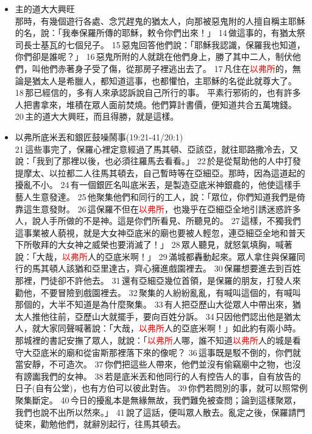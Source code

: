\begin{itemize}
\begin{itemize}
\item 主的道大大興旺\\
那時，有幾個遊行各處、念咒趕鬼的猶太人，向那被惡鬼附的人擅自稱主耶穌的名，說：「我奉保羅所傳的耶穌，敕令你們出來！」 14 做這事的，有猶太祭司長士基瓦的七個兒子。 15 惡鬼回答他們說：「耶穌我認識，保羅我也知道，你們卻是誰呢？」 16 惡鬼所附的人就跳在他們身上，勝了其中二人，制伏他們，叫他們赤著身子受了傷，從那房子裡逃出去了。 17 凡住在\textcolor{red}{以弗所}的，無論是猶太人是希臘人，都知道這事，也都懼怕，主耶穌的名從此就尊大了。 18 那已經信的，多有人來承認訴說自己所行的事。
平素行邪術的，也有許多人把書拿來，堆積在眾人面前焚燒。他們算計書價，便知道共合五萬塊錢。 20 主的道大大興旺，而且得勝，就是這樣。
\item 以弗所底米丟和銀匠鼓噪鬧事(19:21-41/20:1)\\
21 這些事完了，保羅心裡定意經過了馬其頓、亞該亞，就往耶路撒冷去，又說：「我到了那裡以後，也必須往羅馬去看看。」 22 於是從幫助他的人中打發提摩太、以拉都二人往馬其頓去，自己暫時等在亞細亞。那時，因為這道起的擾亂不小。 24 有一個銀匠名叫底米丟，是製造亞底米神銀龕的，他使這樣手藝人生意發達。 25 他聚集他們和同行的工人，說：「眾位，你們知道我們是倚靠這生意發財。 26 這保羅不但在\textcolor{red}{以弗所}，也幾乎在亞細亞全地引誘迷惑許多人，說人手所做的不是神。這是你們所看見、所聽見的。 27 這樣，不獨我們這事業被人藐視，就是大女神亞底米的廟也要被人輕忽，連亞細亞全地和普天下所敬拜的大女神之威榮也要消滅了！」 28 眾人聽見，就怒氣填胸，喊著說：「大哉，\textcolor{red}{以弗所}人的亞底米啊！」 29 滿城都轟動起來。眾人拿住與保羅同行的馬其頓人該猶和亞里達古，齊心擁進戲園裡去。 30 保羅想要進去到百姓那裡，門徒卻不許他去。 31 還有亞細亞幾位首領，是保羅的朋友，打發人來勸他，不要冒險到戲園裡去。 32 聚集的人紛紛亂亂，有喊叫這個的，有喊叫那個的，大半不知道是為什麼聚集。 33 有人把亞歷山大從眾人中帶出來，猶太人推他往前，亞歷山大就擺手，要向百姓分訴。 34 只因他們認出他是猶太人，就大家同聲喊著說：「大哉，\textcolor{red}{以弗所}人的亞底米啊！」如此約有兩小時。那城裡的書記安撫了眾人，就說：「\textcolor{red}{以弗所}人哪，誰不知道\textcolor{red}{以弗所}人的城是看守大亞底米的廟和從宙斯那裡落下來的像呢？ 36 這事既是駁不倒的，你們就當安靜，不可造次。 37 你們把這些人帶來，他們並沒有偷竊廟中之物，也沒有謗讟我們的女神。 38 若是底米丟和他同行的人有控告人的事，自有放告的日子(自有公堂)，也有方伯可以彼此對告。 39 你們若問別的事，就可以照常例聚集斷定。 40 今日的擾亂本是無緣無故，我們難免被查問；論到這樣聚眾，我們也說不出所以然來。」 41 說了這話，便叫眾人散去。亂定之後，保羅請門徒來，勸勉他們，就辭別起行，往馬其頓去。
\end{itemize}


\end{itemize}
